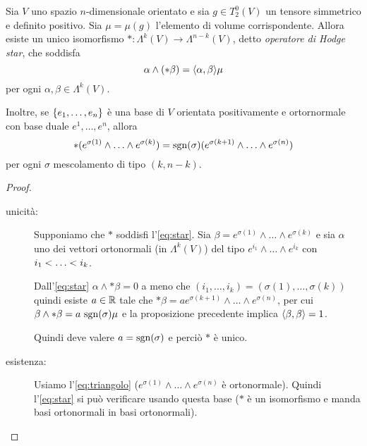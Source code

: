 \begin{proposition} 
	Sia $V$ uno spazio $n$-dimensionale orientato e sia $g\in T^0_2(V)$ un tensore simmetrico e definito positivo.
	Sia $\mu=\mu(g)$ l'elemento di volume corrispondente.
	Allora esiste un unico isomorfismo $*:\Lambda^k(V) \to \Lambda^{n-k}(V)$, detto \emph{operatore di Hodge star}, che soddisfa
	\begin{equation} \label{eq:star}
	 \alpha \wedge (* \beta)= \Scal \alpha\beta \mu
	\end{equation}
	per ogni $\alpha,\beta \in\Lambda^k(V)$.
	
	Inoltre, se $\{\seqb en, \}$ è una base di $V$ orientata positivamente e ortornormale con base duale $e^1, \dots ,e^n$, allora
	\begin{equation}\label{eq:triangolo}
	*(e^{\sigma(1)}\wedge\ldots\wedge e^{\sigma(k)}) = \sgn(\sigma) (e^{\sigma(k+1)}\wedge\ldots\wedge e^{\sigma(n)})
	\end{equation}
	per ogni $\sigma$ mescolamento di tipo $(k,n-k)$.
\end{proposition}
\begin{proof} %
	\begin{description}
		\item [unicità:] Supponiamo che $*$ soddisfi l'\cref{eq:star}. Sia $\beta = e^{\sigma(1)} \wedge\ldots\wedge e^{\sigma(k)}$ e sia $\alpha$ uno dei vettori ortonormali (in $\Lambda^k(V)$) del tipo $e^{i_1}\wedge\ldots\wedge e^{i_k}$ con $\seqb ik<$.
		
		Dall'\cref{eq:star} $\alpha \wedge * \beta=0$ a meno che $(i_1, \ldots,i_k)=(\sigma(1),\ldots,\sigma(k))$
		quindi esiste $a\in\R$ tale che $*\beta = a e^{\sigma(k+1)} \wedge\ldots\wedge e^{\sigma(n)}$, per cui $\beta\wedge * \beta = a\ \sgn(\sigma) \mu$ e la proposizione precedente implica $\Scal \beta\beta=1$.
		
		Quindi deve valere $a = \sgn(\sigma)$ e perciò $*$ è unico.
		
		\item [esistenza:] Usiamo l'\cref{eq:triangolo} ($e^{\sigma(1)}\wedge\ldots\wedge e^{\sigma(n)}$ è ortonormale). Quindi l'\cref{eq:star} si può verificare usando questa base ($*$ è un isomorfismo e manda basi ortonormali in basi ortonormali).
	\end{description}
\end{proof}

